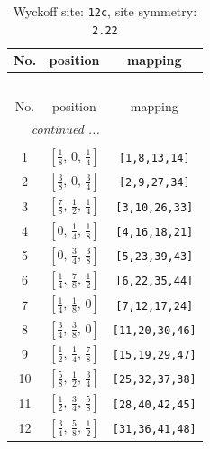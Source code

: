 \documentclass[fleqn,8pt]{jsarticle}
\begin{document}
\begin{longtable}{ccc}
\caption{Wyckoff site: {\tt 12c}, site symmetry: {\tt 2.22}}
 \\
 \hline \hline
No. & position & mapping \\ \hline \endfirsthead

\multicolumn{2}{l}{\tablename\ \thetable{}} \\
 \hline \hline
No. & position & mapping \\ \hline \endhead

 \hline \hline
\multicolumn{2}{r}{\footnotesize\it continued ...} \\ \endfoot

 \hline \hline
\multicolumn{2}{r}{} \\ \endlastfoot

1 & $\left[ \frac{1}{8},\, 0,\, \frac{1}{4} \right]$ & {\tt [1,8,13,14]} \\ \hline
2 & $\left[ \frac{3}{8},\, 0,\, \frac{3}{4} \right]$ & {\tt [2,9,27,34]} \\ \hline
3 & $\left[ \frac{7}{8},\, \frac{1}{2},\, \frac{1}{4} \right]$ & {\tt [3,10,26,33]} \\ \hline
4 & $\left[ 0,\, \frac{1}{4},\, \frac{1}{8} \right]$ & {\tt [4,16,18,21]} \\ \hline
5 & $\left[ 0,\, \frac{3}{4},\, \frac{3}{8} \right]$ & {\tt [5,23,39,43]} \\ \hline
6 & $\left[ \frac{1}{4},\, \frac{7}{8},\, \frac{1}{2} \right]$ & {\tt [6,22,35,44]} \\ \hline
7 & $\left[ \frac{1}{4},\, \frac{1}{8},\, 0 \right]$ & {\tt [7,12,17,24]} \\ \hline
8 & $\left[ \frac{3}{4},\, \frac{3}{8},\, 0 \right]$ & {\tt [11,20,30,46]} \\ \hline
9 & $\left[ \frac{1}{2},\, \frac{1}{4},\, \frac{7}{8} \right]$ & {\tt [15,19,29,47]} \\ \hline
10 & $\left[ \frac{5}{8},\, \frac{1}{2},\, \frac{3}{4} \right]$ & {\tt [25,32,37,38]} \\ \hline
11 & $\left[ \frac{1}{2},\, \frac{3}{4},\, \frac{5}{8} \right]$ & {\tt [28,40,42,45]} \\ \hline
12 & $\left[ \frac{3}{4},\, \frac{5}{8},\, \frac{1}{2} \right]$ & {\tt [31,36,41,48]} \\
\end{longtable}
\renewcommand{\arraystretch}{1.2}
\end{document}
